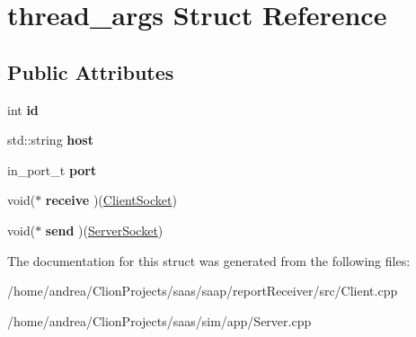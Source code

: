 \hypertarget{structthread__args}{}\section{thread\+\_\+args Struct Reference}
\label{structthread__args}
\subsection*{Public Attributes}
\begin{DoxyCompactItemize}
\item 
int {\bfseries id}\hypertarget{structthread__args_a6322b3468fd88f8f49977a6439e9f352}{}\label{structthread__args_a6322b3468fd88f8f49977a6439e9f352}

\item 
std\+::string {\bfseries host}\hypertarget{structthread__args_a2993a11951278a8e5277b45ac9547d00}{}\label{structthread__args_a2993a11951278a8e5277b45ac9547d00}

\item 
in\+\_\+port\+\_\+t {\bfseries port}\hypertarget{structthread__args_aec0f2f19bebb0641a7a635ad70376db3}{}\label{structthread__args_aec0f2f19bebb0641a7a635ad70376db3}

\item 
void($\ast$ {\bfseries receive} )(\hyperlink{class_client_socket}{Client\+Socket})\hypertarget{structthread__args_a44ed1c0214dc37f162e77dbe0f9dd5fb}{}\label{structthread__args_a44ed1c0214dc37f162e77dbe0f9dd5fb}

\item 
void($\ast$ {\bfseries send} )(\hyperlink{class_server_socket}{Server\+Socket})\hypertarget{structthread__args_a32fa5ab6ec80d4ee564930d62027fd93}{}\label{structthread__args_a32fa5ab6ec80d4ee564930d62027fd93}

\end{DoxyCompactItemize}


The documentation for this struct was generated from the following files\+:\begin{DoxyCompactItemize}
\item 
/home/andrea/\+Clion\+Projects/saas/saap/report\+Receiver/src/Client.\+cpp\item 
/home/andrea/\+Clion\+Projects/saas/sim/app/Server.\+cpp\end{DoxyCompactItemize}
